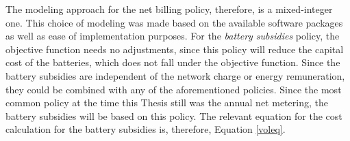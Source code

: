 The modeling approach for the net billing policy, therefore, is a mixed-integer one. This choice of modeling was made based on the available software packages as well as ease of implementation purposes. For the \textit{battery subsidies} policy, the objective function needs no adjustments, since this policy will reduce the capital cost of the batteries, which does not fall under the objective function. Since the battery subsidies are independent of the network charge or energy remuneration, they could be combined with any of the aforementioned policies. Since the most common policy at the time this Thesis still was the annual net metering, the battery subsidies will be based on this policy. The relevant equation for the cost calculation for the battery subsidies is, therefore, Equation \ref{voleq}.
\newline \newline \noindent
